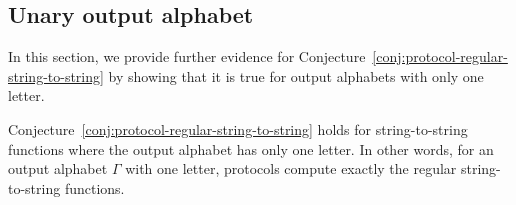\subsection{Unary output alphabet}
\label{sec:unary-output-alphabet}

In this section, we provide further evidence for
Conjecture~\ref{conj:protocol-regular-string-to-string}
 by showing that it is true for output
alphabets with only one letter. 

\begin{theorem}\label{thm:unary-string-to-string}
  Conjecture~\ref{conj:protocol-regular-string-to-string} holds for string-to-string functions where the output alphabet has only one letter. In other words, for an output alphabet $\Gamma$ with one letter, protocols compute exactly the regular string-to-string functions. 
  
\end{theorem}

